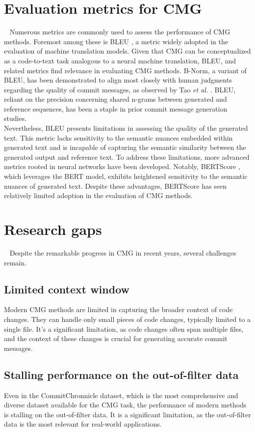 \section{Evaluation metrics for CMG}~\label{sec:eval_metrics}
Numerous metrics are commonly used to assess the performance of CMG methods. Foremost among these is BLEU{ }\cite{papineni2002bleu}, a metric widely adopted in the evaluation of machine translation models. Given that CMG can be conceptualized as a code-to-text task analogous to a neural machine translation, BLEU, and related metrics find relevance in evaluating CMG methods. B-Norm, a variant of BLEU, has been demonstrated to align most closely with human judgments regarding the quality of commit messages, as observed by Tao \textit{et al.}{ }\cite{tao2021evaluation}.
BLEU, reliant on the precision concerning shared n-grams between generated and reference sequences, has been a staple in prior commit message generation studies. \\
Nevertheless, BLEU presents limitations in assessing the quality of the generated text. This metric lacks sensitivity to the semantic nuances embedded within generated text and is incapable of capturing the semantic similarity between the generated output and reference text. To address these limitations, more advanced metrics rooted in neural networks have been developed. Notably, BERTScore{ }\cite{zhang2019bertscore}, which leverages the BERT model, exhibits heightened sensitivity to the semantic nuances of generated text. Despite these advantages, BERTScore has seen relatively limited adoption in the evaluation of CMG methods.

\section{Research gaps}~\label{sec:research_gap}
Despite the remarkable progress in CMG in recent years, several challenges remain. 
\subsection{Limited context window}
Modern CMG methods are limited in capturing the broader context of code changes. They can handle only small pieces of code changes, typically limited to a single file. It's a significant limitation, as code changes often span multiple files, and the context of these changes is crucial for generating accurate commit messages.

\subsection{Stalling performance on the out-of-filter data}
Even in the CommitChronnicle dataset, which is the most comprehensive and diverse dataset available for the CMG task, the performance of modern methods is stalling on the out-of-filter data. It is a significant limitation, as the out-of-filter data is the most relevant for real-world applications.

